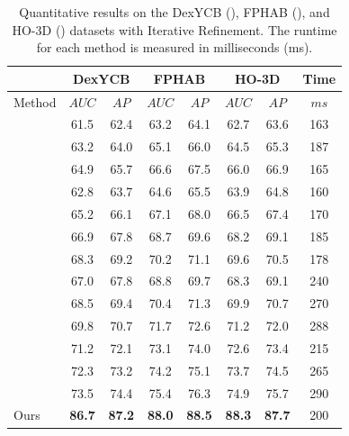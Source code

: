 \begin{table}[h]
\caption{Quantitative results on the DexYCB (\cite{chao2021dexycb}), FPHAB (\cite{garcia2018first}), and HO-3D (\cite{hampali2020honnotate}) datasets with Iterative Refinement. The runtime for each method is measured in milliseconds (ms).}
\label{tab:dataset_with_ir}
\begin{center}
\begin{tabular}{|l|c|c|c|c|c|c|c|} 
\hline
& \multicolumn{2}{c|}{DexYCB} & \multicolumn{2}{c|}{FPHAB} & \multicolumn{2}{c|}{HO-3D} & Time \\
\hline
Method & $AUC$ & $AP$ & $AUC$ & $AP$ & $AUC$ & $AP$ & $ms$ \\  
\hline 
\cite{wang20216d} & 61.5 & 62.4 & 63.2 & 64.1 & 62.7 & 63.6 & 163 \\
\cite{gao20206d} & 63.2 & 64.0 & 65.1 & 66.0 & 64.5 & 65.3 & 187 \\
\cite{guo2021efficient} & 64.9 & 65.7 & 66.6 & 67.5 & 66.0 & 66.9 & 165 \\
\hline 
\cite{billings2019silhonet} & 62.8 & 63.7 & 64.6 & 65.5 & 63.9 & 64.8 & 160 \\
\cite{peng2019pvnet} & 65.2 & 66.1 & 67.1 & 68.0 & 66.5 & 67.4 & 170 \\
\cite{wang2021gdr} & 66.9 & 67.8 & 68.7 & 69.6 & 68.2 & 69.1 & 185 \\
\cite{castro2023crt} & 68.3 & 69.2 & 70.2 & 71.1 & 69.6 & 70.5 & 178 \\
\hline
\cite{wang2019densefusion} & 67.0 & 67.8 & 68.8 & 69.7 & 68.3 & 69.1 & 240 \\
\cite{he2020pvn3d} & 68.5 & 69.4 & 70.4 & 71.3 & 69.9 & 70.7 & 270 \\
\cite{he2021ffb6d} & 69.8 & 70.7 & 71.7 & 72.6 & 71.2 & 72.0 & 288 \\
\cite{wu2023geometric} & 71.2 & 72.1 & 73.1 & 74.0 & 72.6 & 73.4 & 215 \\
\cite{hong2024rdpn6d} & 72.3 & 73.2 & 74.2 & 75.1 & 73.7 & 74.5 & 265 \\
\cite{lin2024hipose} & 73.5 & 74.4 & 75.4 & 76.3 & 74.9 & 75.7 & 290 \\
Ours & \textbf{86.7} & \textbf{87.2} & \textbf{88.0} & \textbf{88.5} & \textbf{88.3} & \textbf{87.7} & 200 \\
\hline
\end{tabular}
\end{center}
\end{table}



